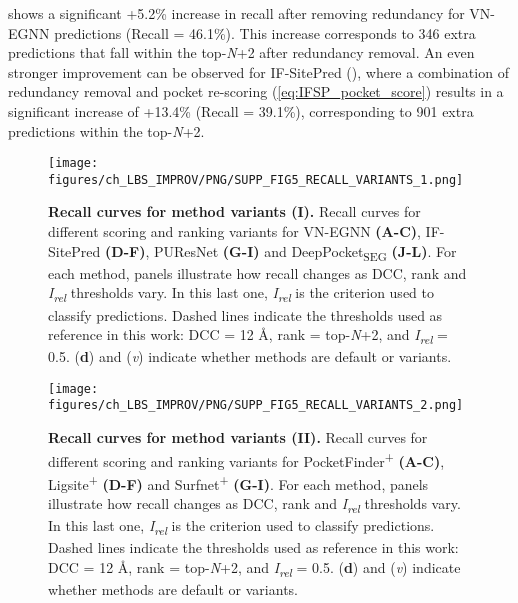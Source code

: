  shows a significant +5.2\% increase in recall after removing redundancy for VN-EGNN predictions (Recall = 46.1\%). This increase corresponds to 346 extra predictions that fall within the top-\textit{N}+2 after redundancy removal. An even stronger improvement can be observed for IF-SitePred (), where a combination of redundancy removal and pocket re-scoring (\autoref{eq:IFSP_pocket_score}) results in a significant increase of +13.4\% (Recall = 39.1\%), corresponding to 901 extra predictions within the top-\textit{N}+2.

\begin{figure}[htbp!]
    \centering
    \texttt{[image: figures/ch\_LBS\_IMPROV/PNG/SUPP\_FIG5\_RECALL\_VARIANTS\_1.png]}
    \caption[Recall curves for method variants (I)]{\textbf{Recall curves for method variants (I).} Recall curves for different scoring and ranking variants for VN-EGNN \textbf{(A-C)}, IF-SitePred \textbf{(D-F)}, PUResNet \textbf{(G-I)} and DeepPocket\textsubscript{SEG} \textbf{(J-L)}. For each method, panels illustrate how recall changes as DCC, rank and \textit{I\textsubscript{rel}} thresholds vary. In this last one, \textit{I\textsubscript{rel}} is the criterion used to classify predictions. Dashed lines indicate the thresholds used as reference in this work: DCC = 12 \AA{}, rank = top-\textit{N}+2, and \textit{I\textsubscript{rel}} = 0.5. (\textbf{d}) and (\textit{v}) indicate whether methods are default or variants.}
    \label{fig:pocker_recall_variants1}
\end{figure}

\begin{figure}[htb!]
    \centering
    \texttt{[image: figures/ch\_LBS\_IMPROV/PNG/SUPP\_FIG5\_RECALL\_VARIANTS\_2.png]}
    \caption[Recall curves for method variants (II)]{\textbf{Recall curves for method variants (II).} Recall curves for different scoring and ranking variants for PocketFinder\textsuperscript{+} \textbf{(A-C)}, Ligsite\textsuperscript{+} \textbf{(D-F)} and Surfnet\textsuperscript{+} \textbf{(G-I)}. For each method, panels illustrate how recall changes as DCC, rank and \textit{I\textsubscript{rel}} thresholds vary. In this last one, \textit{I\textsubscript{rel}} is the criterion used to classify predictions. Dashed lines indicate the thresholds used as reference in this work: DCC = 12 \AA{}, rank = top-\textit{N}+2, and \textit{I\textsubscript{rel}} = 0.5. (\textbf{d}) and (\textit{v}) indicate whether methods are default or variants.}
    \label{fig:pocker_recall_variants2}
\end{figure}

